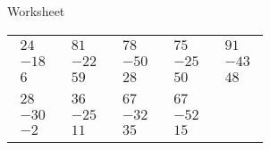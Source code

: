 \documentclass[15pt]{scrartcl}
\begin{document}
	\begin{center}
		\LARGE Worksheet
	\end{center}
	\begin{tabu} to \linewidth {XXXXX}
		$\begin{array}{r}
			24 \\
			-18 \\
			\hline
			6
			\end{array}$
		
		&
		$\begin{array}{r}
			81 \\
			-22 \\
			\hline
			59
			\end{array}$
		
		&
		$\begin{array}{r}
			78 \\
			-50 \\
			\hline
			28
			\end{array}$
		
		&
		$\begin{array}{r}
			75 \\
			-25 \\
			\hline
			50
			\end{array}$
		
		&
		$\begin{array}{r}
			91 \\
			-43 \\
			\hline
			48
			\end{array}$
		

		\\
		$\begin{array}{r}
			28 \\
			-30 \\
			\hline
			-2
			\end{array}$
		
		&
		$\begin{array}{r}
			36 \\
			-25 \\
			\hline
			11
			\end{array}$
		
		&
		$\begin{array}{r}
			67 \\
			-32 \\
			\hline
			35
			\end{array}$
		
		&
		$\begin{array}{r}
			67 \\
			-52 \\
			\hline
			15
			\end{array}$
		

\end{tabu}
\end{document}
